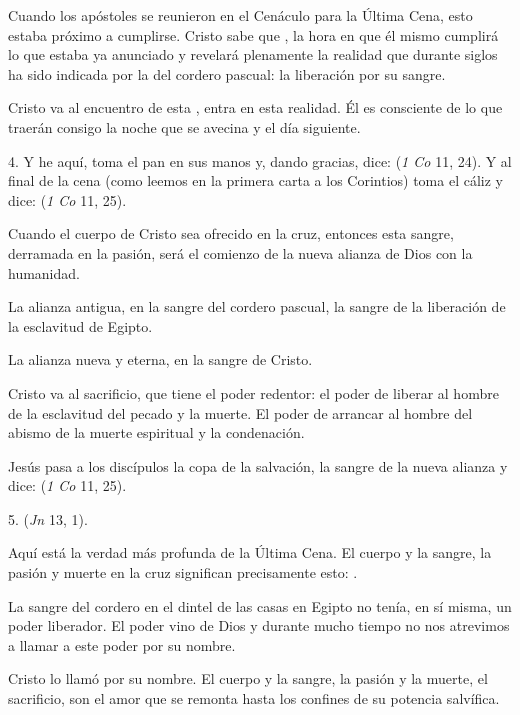 \begin{body}
Cuando los apóstoles se reunieron en el Cenáculo para la Última Cena, esto estaba próximo a cumplirse. Cristo sabe que , la hora en que él mismo cumplirá lo que estaba ya anunciado y revelará plenamente la realidad que durante siglos ha sido indicada por la  del cordero pascual: la liberación por su sangre. 

Cristo va al encuentro de esta , entra en esta realidad. Él es consciente de lo que traerán consigo la noche que se avecina y el día siguiente. 

4. Y he aquí, toma el pan en sus manos y, dando gracias, dice:  (\textit{1 Co} 11, 24). Y al final de la cena (como leemos en la primera carta a los Corintios) toma el cáliz y dice:  (\textit{1 Co} 11, 25). 

Cuando el cuerpo de Cristo sea ofrecido en la cruz, entonces esta sangre, derramada en la pasión, será el comienzo de la nueva alianza de Dios con la humanidad. 

La alianza antigua, en la sangre del cordero pascual, la sangre de la liberación de la esclavitud de Egipto. 

La alianza nueva y eterna, en la sangre de Cristo. 

Cristo va al sacrificio, que tiene el poder redentor: el poder de liberar al hombre de la esclavitud del pecado y la muerte. El poder de arrancar al hombre del abismo de la muerte espiritual y la condenación. 

Jesús pasa a los discípulos la copa de la salvación, la sangre de la nueva alianza y dice:  (\textit{1 Co} 11, 25). 

5.  (\textit{Jn} 13, 1). 

Aquí está la verdad más profunda de la Última Cena. El cuerpo y la sangre, la pasión y muerte en la cruz significan precisamente esto: . 

La sangre del cordero en el dintel de las casas en Egipto no tenía, en sí misma, un poder liberador. El poder vino de Dios y durante mucho tiempo no nos atrevimos a llamar a este poder por su nombre. 

Cristo lo llamó por su nombre. El cuerpo y la sangre, la pasión y la muerte, el sacrificio, son el amor que se remonta hasta los confines de su potencia salvífica.


\end{body}

